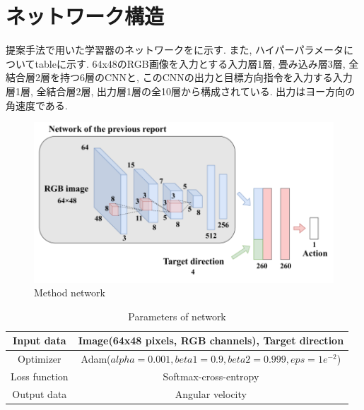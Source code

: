 
\section{ネットワーク構造}
提案手法で用いた学習器のネットワークをに示す. また, ハイパーパラメータについてtableに示す. 64x48のRGB画像を入力とする入力層1層, 畳み込み層3層, 全結合層2層を持つ6層のCNNと, このCNNの出力と目標方向指令を入力する入力層1層, 全結合層2層, 出力層1層の全10層から構成されている. 出力はヨー方向の角速度である.

\begin{figure}[hbtp]
  \centering
 \includegraphics[keepaspectratio, scale=0.4]
      {images/network_structure.png}
 \caption{Method network}
 \label{Fig:network_structure}
\end{figure}

\begin{table}[hbtp]
  \caption{Parameters of network}
  \label{table:param1}
  \centering
  \begin{tabular}{|c|c|}
    \hline
    Input data & Image(64x48 pixels, RGB channels), Target direction \\
    \hline
    Optimizer & Adam($alpha = 0.001, beta1 = 0.9, beta2 =  0.999, eps = 1e^{-2}$)\\
    \hline
    Loss function & Softmax-cross-entropy\\
    \hline
    Output data & Angular velocity\\
    \hline
  \end{tabular}
\end{table}


\newpage
